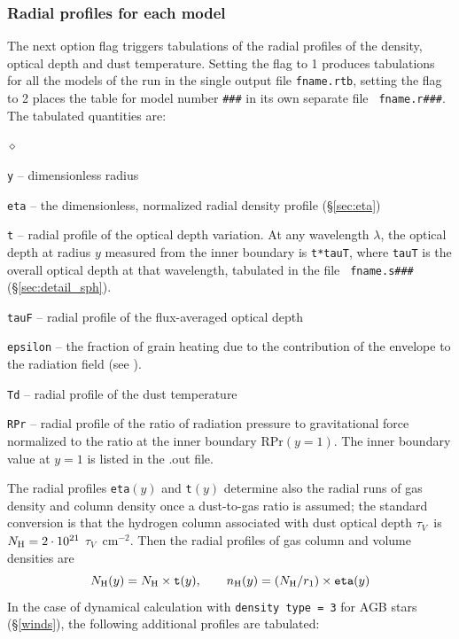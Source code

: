 \documentclass[11pt]{article}
\def\E#1{\hbox{$10^{#1}$}}
\def\tV     {\hbox{$\tau_V$}}
\begin{document}
\subsubsection{Radial profiles for each model}
\label{sec:radial_sph}

The next option flag triggers tabulations of the radial profiles of
the density, optical depth and dust temperature. Setting the flag to 1
produces tabulations for all the models of the run in the single
output file {\tt fname.rtb}, setting the flag to 2 places the table
for model number {\tt \#\#\#} in its own separate file {\tt
  fname.r\#\#\#}. The tabulated quantities are:

\begin{list}{$\diamond$}{}
\item{\tt y} -- dimensionless radius
\item{\tt eta} -- the dimensionless, normalized radial density profile
  (\S \ref{sec:eta})
\item {\tt t} -- radial profile of the optical depth variation.  At
  any wavelength $\lambda$, the optical depth at radius $y$ measured
  from the inner boundary is {\tt t*tauT}, where {\tt tauT} is the
  overall optical depth at that wavelength, tabulated in the file {\tt
    fname.s\#\#\#} (\S \ref{sec:detail_sph}).

\item{\tt tauF} -- radial profile of the flux-averaged optical depth
\item {\tt epsilon} -- the fraction of grain heating due to the
  contribution of the envelope to the radiation field (see
  \cite{IE97}).
\item{\tt Td} -- radial profile of the dust temperature
\item{\tt RPr} -- radial profile of the ratio of radiation pressure to
    gravitational force normalized to the ratio at the inner boundary RPr$(y =
    1)$. The inner boundary value at $y = 1$ is listed in the .out file.

\end{list}
The radial profiles {\tt eta}$(y)$ and {\tt t}$(y)$ determine also the radial
runs of gas density and column density once a dust-to-gas ratio is assumed;
the standard conversion is that the hydrogen column associated with dust
optical depth \tV\ is $N_{\rm H} = 2\cdot\E{21}$ \tV\ cm$^{-2}$. Then the
radial profiles of gas column and volume densities are
\begin{equation}\label{eq:profiles}
  N_{\rm H}(y) = N_{\rm H}\times{\tt t}(y), \qquad
  n_{\rm H}(y) = (N_{\rm H}/r_1)\times{\tt eta}(y)
\end{equation}
In the case of dynamical calculation with {\tt density type = 3} for AGB stars
(\S\ref{winds}), the following additional profiles are tabulated:
\end{document}
